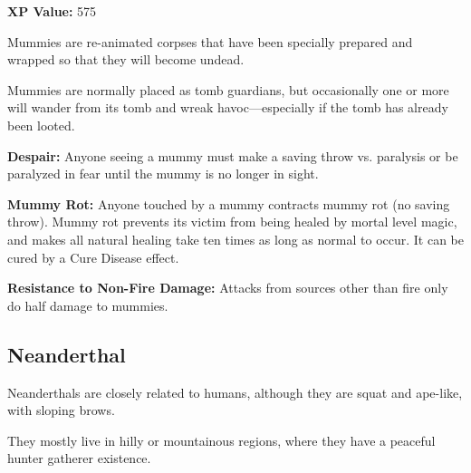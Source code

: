 \begin{multicols*}{2}
{{\textbf{XP Value:} 575}}

Mummies are re-animated corpses that have been specially prepared and wrapped so that they will become undead.

Mummies are normally placed as tomb guardians, but occasionally one or more will wander from its tomb and wreak havoc—especially if the tomb has already been looted.

\textbf{Despair:} Anyone seeing a mummy must make a saving throw vs. paralysis or be paralyzed in fear until the mummy is no longer in sight.

\textbf{Mummy Rot:} Anyone touched by a mummy contracts mummy rot (no saving throw). Mummy rot prevents its victim from being healed by mortal level magic, and makes all natural healing take ten times as long as normal to occur. It can be cured by a Cure Disease effect.

\textbf{Resistance to Non-Fire Damage:} Attacks from sources other than fire only do half damage to mummies.

\subsection{Neanderthal}\label{monster:Neanderthal}

Neanderthals are closely related to humans, although they are squat and ape-like, with sloping brows.

They mostly live in hilly or mountainous regions, where they have a peaceful hunter gatherer existence.


\end{multicols*}
